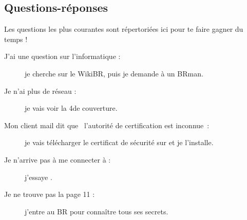 \subsection{Questions-réponses}

Les questions les plus courantes sont répertoriées ici pour te faire gagner du temps !

\begin{description}

\item[J'ai une question sur l'informatique : ] je cherche sur le WikiBR, puis je demande à un BRman.

\item[Je n'ai plus de réseau : ] je vais voir la 4\ieme de couverture.

\item[Mon client mail dit que \guillemotleft~l'autorité de certification est inconnue~\guillemotright : ] je vais télécharger le certificat de sécurité
sur  et je l'installe.


\item[Je n'arrive pas à me connecter à  : ] j'essaye .



\item[Je ne trouve pas la page 11 : ] j'entre au BR pour connaître tous ses secrets.

\end{description}
